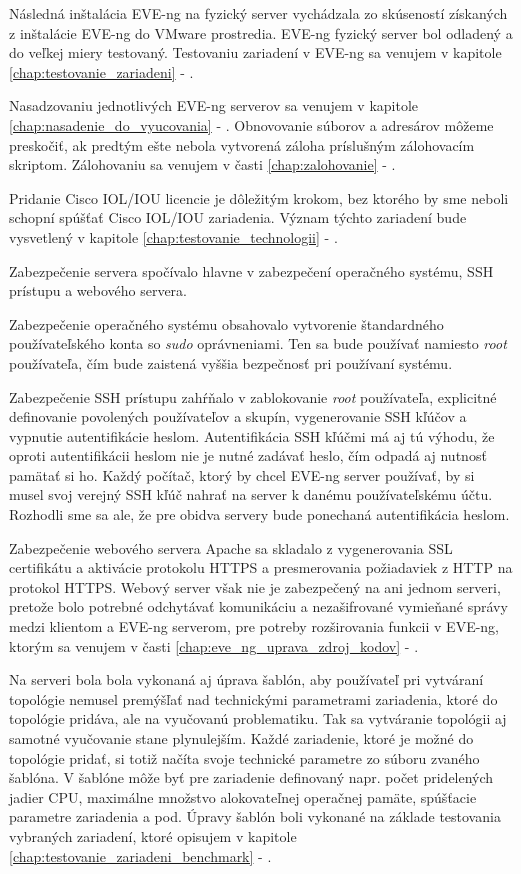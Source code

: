 Následná inštalácia EVE-ng na fyzický server vychádzala zo skúseností získaných z inštalácie EVE-ng do VMware prostredia. EVE-ng fyzický server bol odladený a do veľkej miery testovaný. Testovaniu zariadení v EVE-ng sa venujem v kapitole \ref{chap:testovanie_zariadeni} - .

Nasadzovaniu jednotlivých EVE-ng serverov sa venujem v kapitole \ref{chap:nasadenie_do_vyucovania} - . Obnovovanie súborov a adresárov môžeme preskočiť, ak predtým ešte nebola vytvorená záloha príslušným zálohovacím skriptom. Zálohovaniu sa venujem v časti \ref{chap:zalohovanie} - .

Pridanie Cisco IOL/IOU licencie je dôležitým krokom, bez ktorého by sme neboli schopní spúšťať Cisco IOL/IOU zariadenia. Význam týchto zariadení bude vysvetlený v kapitole \ref{chap:testovanie_technologii} - .

Zabezpečenie servera spočívalo hlavne v zabezpečení operačného systému, SSH prístupu a webového servera.

Zabezpečenie operačného systému obsahovalo vytvorenie štandardného používateľského konta so \emph{sudo} oprávneniami. Ten sa bude používať namiesto \emph{root} používateľa, čím bude zaistená vyššia bezpečnosť pri používaní systému.

Zabezpečenie SSH prístupu zahŕňalo v zablokovanie \emph{root} používateľa, explicitné definovanie povolených používateľov a skupín, vygenerovanie SSH kľúčov a vypnutie autentifikácie heslom. Autentifikácia SSH kľúčmi má aj tú výhodu, že oproti autentifikácii heslom nie je nutné zadávať heslo, čím odpadá aj nutnosť pamätať si ho. Každý počítač, ktorý by chcel EVE-ng server používať, by si musel svoj verejný SSH kľúč nahrať na server k danému používateľskému účtu. Rozhodli sme sa ale, že pre obidva servery bude ponechaná autentifikácia heslom.

Zabezpečenie webového servera Apache sa skladalo z vygenerovania SSL certifikátu a aktivácie protokolu HTTPS a presmerovania požiadaviek z HTTP na protokol HTTPS. Webový server však nie je zabezpečený na ani jednom serveri, pretože bolo potrebné odchytávať komunikáciu a nezašifrované vymieňané správy medzi klientom a EVE-ng serverom, pre potreby rozširovania funkcii v EVE-ng, ktorým sa venujem v časti \ref{chap:eve_ng_uprava_zdroj_kodov} - .

Na serveri bola bola vykonaná aj úprava šablón, aby používateľ pri vytváraní topológie nemusel premýšľať nad technickými parametrami zariadenia, ktoré do topológie pridáva, ale na vyučovanú problematiku. Tak sa vytváranie topológii aj samotné vyučovanie stane plynulejším. Každé zariadenie, ktoré je možné do topológie pridať, si totiž načíta svoje technické parametre zo súboru zvaného šablóna. V šablóne môže byť pre zariadenie definovaný napr. počet pridelených jadier CPU, maximálne množstvo alokovateľnej operačnej pamäte, spúšťacie parametre zariadenia a pod. Úpravy šablón boli vykonané na základe testovania vybraných zariadení, ktoré opisujem v kapitole \ref{chap:testovanie_zariadeni_benchmark} - .




